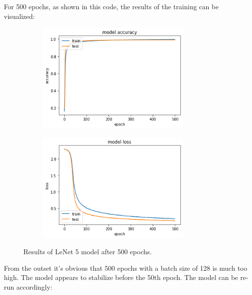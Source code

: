 \documentclass{article}
\begin{document}
For 500 epochs, as shown in this code, the results of the training can be visualized:

\begin{figure}[H]
\centering
\begin{subfigure}
  \centering
  \includegraphics[width=3in]{csci-8920/hw-2/images/accuracy.png}
  \label{fig:accuracy}
\end{subfigure}%
\begin{subfigure}
  \centering
  \includegraphics[width=3in]{csci-8920/hw-2/images/loss.png}
  \label{fig:loss}
\end{subfigure}
\caption{Results of LeNet 5 model after 500 epochs.}
\label{fig:default}
\end{figure}

From the outset it's obvious that 500 epochs with a batch size of 128 is much too high.
The model appears to stabilize before the 50th epoch.
The model can be re-run accordingly:
\end{document}
